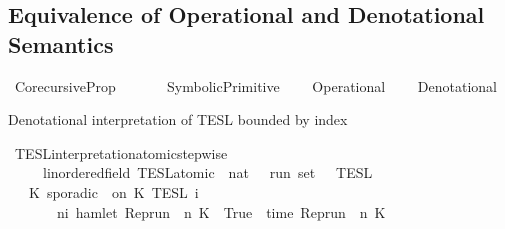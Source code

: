 %
\begin{isabellebody}%
%
%
\begin{isamarkuptext}%
\chapter[Semantics Equivalence]{Equivalence of Operational and Denotational Semantics}%
\end{isamarkuptext}\isamarkuptrue%
%
\isadelimtheory
%
\endisadelimtheory
%
\isatagtheory
{}\isamarkupfalse%
\ Corecursive{\isacharunderscore}Prop\isanewline
\ \ \isanewline
\ \ \ \ SymbolicPrimitive\isanewline
\ \ \ \ Operational\isanewline
\ \ \ \ Denotational\isanewline
\isanewline
{}%
\endisatagtheory
{\isafoldtheory}%
%
\isadelimtheory
%
\endisadelimtheory
%
\isadelimdocument
%
\endisadelimdocument
%
\isatagdocument
%
\isamarkuptrue%
%
\endisatagdocument
{\isafolddocument}%
%
\isadelimdocument
%
\endisadelimdocument
%
\begin{isamarkuptext}%
Denotational interpretation of TESL bounded by index%
\end{isamarkuptext}\isamarkuptrue%
\isamarkupfalse%
\ TESL{\isacharunderscore}interpretation{\isacharunderscore}atomic{\isacharunderscore}stepwise\isanewline
\ \ \ \ {\isacharcolon}{\isacharcolon}\ {\isacartoucheopen}{\isacharparenleft}{\isacharprime}{\isasymtau}{\isacharcolon}{\isacharcolon}linordered{\isacharunderscore}field{\isacharparenright}\ TESL{\isacharunderscore}atomic\ {\isasymRightarrow}\ nat\ {\isasymRightarrow}\ {\isacharprime}{\isasymtau}\ run\ set{\isacartoucheclose}\ {\isacharparenleft}{\isachardoublequoteopen}{\isasymlbrakk}\ {\isacharunderscore}\ {\isasymrbrakk}\isactrlsub T\isactrlsub E\isactrlsub S\isactrlsub L\isactrlbsup {\isasymge}\ {\isacharunderscore}\isactrlesup {\isachardoublequoteclose}{\isacharparenright}\isanewline
{}\isanewline
\ \ {\isacartoucheopen}{\isasymlbrakk}\ K\ sporadic\ {\isasymtau}\ on\ K\ {\isasymrbrakk}\isactrlsub T\isactrlsub E\isactrlsub S\isactrlsub L\isactrlbsup {\isasymge}\ i\isactrlesup \ {\isacharequal}\isanewline
\ \ \ \ \ \ {\isacharbraceleft}{\isasymrho}{\isachardot}\ {\isasymexists}n{\isasymge}i{\isachardot}\ hamlet\ {\isacharparenleft}{\isacharparenleft}Rep{\isacharunderscore}run\ {\isasymrho}{\isacharparenright}\ n\ K\ {\isacharequal}\ True\ {\isasymand}\ time\ {\isacharparenleft}{\isacharparenleft}Rep{\isacharunderscore}run\ {\isasymrho}{\isacharparenright}\ n\ K\ {\isacharequal}\ {\isasymtau}{\isacharbraceright}{\isacartoucheclose}\isanewline

\end{isabellebody}
